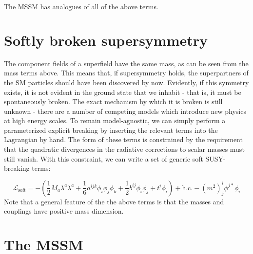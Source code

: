 The MSSM has analogues of all of the above terms.

\section{Softly broken supersymmetry}
The component fields of a superfield have the same mass, as can be seen from the mass terms above. This means that, if supersymmetry holds, the superpartners of the SM particles should have been discovered by now. Evidently, if this symmetry exists, it is not evident in the ground state that we inhabit - that is, it must be spontaneously broken. The exact mechanism by which it is broken is still unknown - there are a number of competing models which introduce new physics at high energy scales. To remain model-agnostic, we can simply perform a parameterized explicit breaking by inserting the relevant terms into the Lagrangian by hand. The form of these terms is constrained by the requirement that the quadratic divergences in the radiative corrections to scalar masses must still vanish. With this constraint, we can write a set of generic soft SUSY-breaking terms:

\[\mathcal{L}_\text{soft} = -\left(\frac{1}{2}M_a\lambda^a\lambda^a+\frac{1}{6}a^{ijk}\phi_i\phi_j\phi_k+\frac{1}{2}b^{ij}\phi_i\phi_j+t^i\phi_i\right)+\text{h.c.}-(m^2)_j^i\phi^{j*}\phi_i\]
Note that a general feature of the the above terms is that the masses and couplings have positive mass dimension.

\section{The MSSM}

